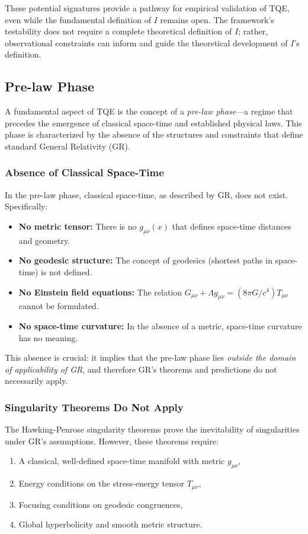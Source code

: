 \documentclass[12pt,a4paper]{article}
\theoremstyle{definition}
\theoremstyle{remark}
\begin{document}
These potential signatures provide a pathway for empirical validation of TQE, even while the fundamental definition of $I$ remains open. The framework's testability does not require a complete theoretical definition of $I$; rather, observational constraints can inform and guide the theoretical development of $I$'s definition.

\subsection{Pre-law Phase}

A fundamental aspect of TQE is the concept of a \emph{pre-law phase}—a regime that precedes the emergence of classical space-time and established physical laws. This phase is characterized by the absence of the structures and constraints that define standard General Relativity (GR).

\subsubsection{Absence of Classical Space-Time}

In the pre-law phase, classical space-time, as described by GR, does not exist. Specifically:
\begin{itemize}
\item \textbf{No metric tensor:} There is no $g_{\mu\nu}(x)$ that defines space-time distances and geometry.
\item \textbf{No geodesic structure:} The concept of geodesics (shortest paths in space-time) is not defined.
\item \textbf{No Einstein field equations:} The relation $G_{\mu\nu} + \Lambda g_{\mu\nu} = (8\pi G/c^4) T_{\mu\nu}$ cannot be formulated.
\item \textbf{No space-time curvature:} In the absence of a metric, space-time curvature has no meaning.
\end{itemize}

This absence is crucial: it implies that the pre-law phase lies \emph{outside the domain of applicability of GR}, and therefore GR's theorems and predictions do not necessarily apply.

\subsubsection{Singularity Theorems Do Not Apply}

The Hawking-Penrose singularity theorems \cite{hawking1970singularities, penrose1965gravitational} prove the inevitability of singularities under GR's assumptions. However, these theorems require:
\begin{enumerate}
\item A classical, well-defined space-time manifold with metric $g_{\mu\nu}$,
\item Energy conditions on the stress-energy tensor $T_{\mu\nu}$,
\item Focusing conditions on geodesic congruences,
\item Global hyperbolicity and smooth metric structure.
\end{enumerate}
\end{document}

